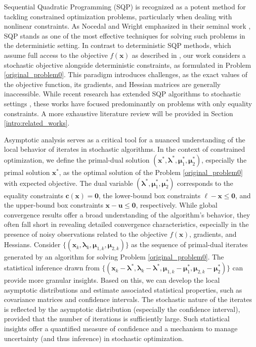 \documentclass[aos]{imsart}
\numberwithin{equation}{section}
\theoremstyle{plain}
\begin{document}
Sequential Quadratic Programming (SQP) is recognized as a potent method for tackling constrained optimization problems, particularly when dealing with nonlinear constraints. As Nocedal and Wright emphasized in their seminal work \cite{jorge2006numerical}, SQP stands as one of the most effective techniques for solving such problems in the deterministic setting.
In contrast to deterministic SQP methods, which assume full access to the objective $f(\bm{x})$ as described in \cite{boggs1995sequential, jorge2006numerical}, our work considers a stochastic objective alongside deterministic constraints, as formulated in Problem \eqref{original_problem0}.
This paradigm introduces challenges, as the exact values of the objective function, its gradients, and Hessian matrices are generally inaccessible.
While recent research has extended SQP algorithms to stochastic settings \cite{na2022asymptotic, na2023inequality, fang2022fully, na2023adaptive, curtis2023worst, curtis2023sequential, curtis2021inexact, berahas2021stochastic, duchi2021asymptotic}, these works have focused predominantly on problems with only equality constraints. 
A more exhaustive literature review will be provided in Section \ref{intro:related_works}.


Asymptotic analysis serves as a critical tool for a nuanced understanding of the local behavior of iterates in stochastic algorithms. In the context of constrained optimization, we define the primal-dual solution $(\bm{x}^{*}, \bm{\lambda}^{*}, \bm{\mu}_1^{*}, \bm{\mu}_2^{*})$, especially the primal solution $\bm{x}^{*}$, as the optimal solution of the Problem \eqref{original_problem0} with expected objective. 
The dual variable $(\bm{\lambda}^{*}, \bm{\mu}_1^{*}, \bm{\mu}_2^{*})$ corresponds to the equality constraints $\bm{c}(\bm{x}) = \bm{0}$, the lower-bound box constraints $\bm{\ell} - \bm{x} \leq \bm{0}$, and the upper-bound box constraints  $\bm{x} - \bm{u} \leq \bm{0}$, respectively. 
While global convergence results offer a broad understanding of the algorithm's behavior, they often fall short in revealing detailed convergence characteristics, especially in the presence of noisy observations related to the objective \(f(\bm{x})\), gradients, and Hessians.
Consider $\{(\bm{x}_k, \bm{\lambda}_{k}, \bm{\mu}_{1,k}, \bm{\mu}_{2,k})\}$ as the sequence of primal-dual iterates generated by an algorithm for solving Problem \eqref{original_problem0}. The statistical inference drawn from $\{(\bm{x}_k - \bm{\lambda}^{*}, \bm{\lambda}_{k} - \bm{\lambda}^{*}, \bm{\mu}_{1,k} - \bm{\mu}_1^{*}, \bm{\mu}_{2,k} - \bm{\mu}_2^{*})\}$ 
can provide more granular insights.
Based on this, we can develop the local asymptotic distributions and estimate associated statistical properties, such as covariance matrices and confidence intervals. 
The stochastic nature of the iterates is reflected by the asymptotic distribution (especially the confidence interval), provided that the number of iterations is sufficiently large. 
Such statistical insights offer a quantified measure of confidence and a mechanism to manage uncertainty (and thus inference) in stochastic optimization. 
\end{document}
